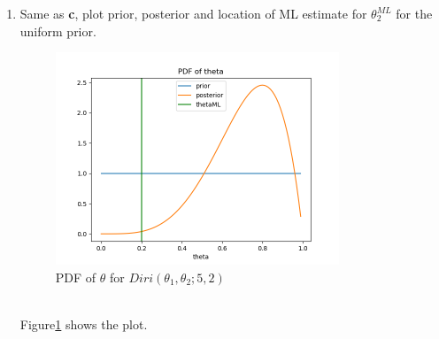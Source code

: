 \documentclass[preprint,12pt]{elsarticle}
\begin{document}
\begin{enumerate}[label=\alph*]
		\item Same as \textbf{c}, plot prior, posterior and location of ML estimate for 
		$\theta_2^{ML}$ for the uniform prior.
		\begin{figure}[h!]
            \center
			\includegraphics[width=0.8\textwidth]{4.png}
			\caption{PDF of $\theta$ for $Diri(\theta_1,\theta_2;5,2)$}
			\label{fig:2}
		\end{figure}
		\\Figure\ref{fig:2} shows the plot.

	\end{enumerate}
\end{document}
